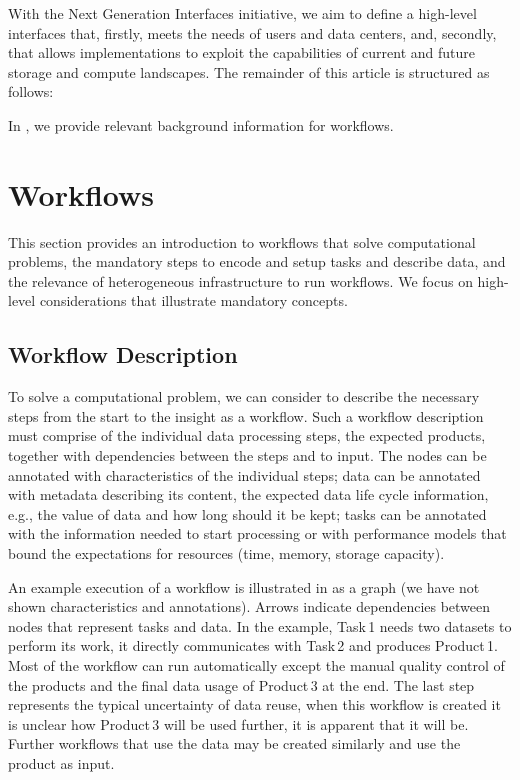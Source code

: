 \documentclass[a4paper, twocolumn]{article}
\begin{document}
\medskip

With the Next Generation Interfaces initiative, we aim to define a high-level interfaces that, firstly, meets the needs of users and data centers, and, secondly, that allows implementations to exploit the capabilities of current and future storage and compute landscapes.
The remainder of this article is structured as follows: \\

In , we provide relevant background information for workflows.


\section{Workflows}
\label{sec:background}
This section provides an introduction to workflows that solve computational problems, the mandatory steps to encode and setup tasks and describe data, and the relevance of  heterogeneous infrastructure to run workflows.
We focus on high-level considerations that illustrate mandatory concepts.


\subsection{Workflow Description}

To solve a computational problem, we can consider to describe the necessary steps from the start to the insight as a workflow.
Such a workflow description must comprise of the individual data processing steps, the expected  products, together with dependencies between the steps and to input.
The nodes can be annotated with characteristics of the individual steps;
data can be annotated with metadata describing its content, the expected data life cycle information, e.g., the value of data and how long should it be kept; tasks can be annotated with the information needed to start processing or with performance models that bound the  expectations for resources (time, memory, storage capacity).

An example execution of a workflow is illustrated in  as a graph (we have not shown characteristics and annotations).
Arrows indicate dependencies between nodes that represent tasks and data.
In the example, Task\,1 needs two datasets to perform its work, it directly communicates with Task\,2 and produces Product\,1.
Most of the workflow can run automatically except the manual quality control of the products and the final data usage of Product\,3 at the end.
The last step represents the typical uncertainty of data reuse, when this workflow is created it is unclear how Product\,3 will be used further, it is apparent that it will be.
Further workflows that use the data may be created similarly and use the product as input.
\end{document}
